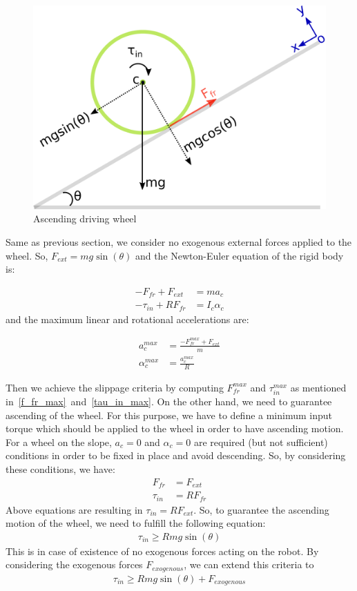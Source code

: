 \documentclass[letterpaper, 10pt, conference]{ieeeconf}
\begin{document}
\begin{figure}[!h] 
	\centering
	\includegraphics[width=0.85\columnwidth]{figs/slopeUp.pdf}
	\caption{Ascending driving wheel}
	\label{slopeUp}
\end{figure}


Same as previous section, we consider no exogenous external forces applied to the wheel. So, $F_{ext} = mg\sin(\theta)$ and the Newton-Euler equation of the rigid body is:

\begin{align}
-F_{fr} + F_{ext} &= ma_c \label{DWSlope_force_ac} \\
-\tau_{in} + RF_{fr} &= I_c \alpha_c \label{DWSlope_torque_ac}
\end{align}
and the maximum linear and rotational accelerations are:

\begin{align}
a_c^{max} &= \frac{-F_{fr}^{max} + F_{ext}}{m} \\
\alpha_c^{max} &= \frac{a_c^{max}}{R}
\end{align}

Then we achieve the slippage criteria by computing $F_{fr}^{max}$ and $\tau_{in}^{max}$ as mentioned in~\eqref{f_fr_max}~and~\eqref{tau_in_max}. On the other hand, we need to guarantee ascending of the wheel. For this purpose, we have to define a minimum input torque which should be applied to the wheel in order to have ascending motion. For a wheel on the slope, $a_c = 0$ and $\alpha_c = 0 $ are required (but not sufficient) conditions in order to be fixed in place and avoid descending. So, by considering these conditions, we have:
\begin{align}
F_{fr} &= F_{ext} \\
\tau_{in} &= RF_{fr}
\end{align}
Above equations are resulting in $\tau_{in} = RF_{ext}$. So, to guarantee the ascending motion of the wheel, we need to fulfill the following equation:
\begin{align}
\tau_{in} \geqslant R mg\sin(\theta)
\end{align}
This is in case of existence of no exogenous forces acting on the robot. By considering the exogenous forces $F_{exogenous}$, we can extend this criteria to
\begin{align}
\tau_{in} \geqslant R mg\sin(\theta) + F_{exogenous}
\end{align}
\end{document}

